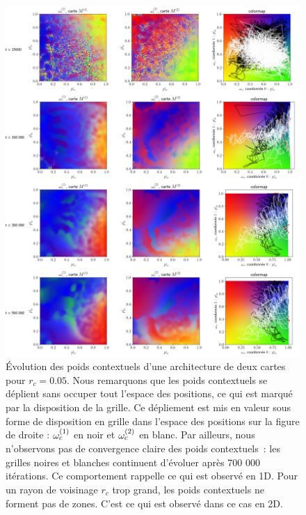 \documentclass[../main]{subfiles}
\begin{document}
\begin{figure}[p]
	\includegraphics[width=\textwidth]{2SOM_sphere_rc005_evol}
	\caption{\'Evolution des poids contextuels d'une architecture de deux cartes pour $r_c =0.05$. 
	Nous remarquons que les poids contextuels se déplient sans occuper tout l'espace des positions, ce qui est marqué par la disposition de la grille. Ce dépliement est mis en valeur sous forme de disposition en grille dans l'espace des positions sur la figure de droite : $\omega_c^{({1})}$ en noir et $\omega_c^{({2})}$ en blanc. Par ailleurs, nous n'observons pas de convergence claire des poids contextuels~: les grilles noires et blanches continuent d'évoluer après 700 000 itérations.
	Ce comportement rappelle ce qui est observé en 1D. Pour un rayon de voisinage $r_c$ trop grand, les poids contextuels ne forment pas de zones. C'est ce qui est observé dans ce cas en 2D.
	\label{fig:rc_005}}
\end{figure}
\end{document}
